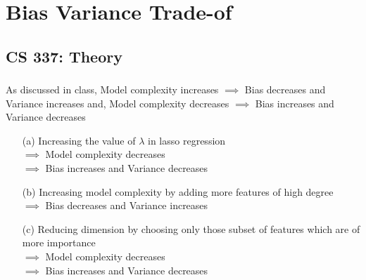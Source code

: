 \documentclass[12pt, fleqn]{article}
\begin{document}
\newpage
\section{Bias Variance Trade-of}
\subsection{CS 337: Theory}
\subsubsection{}
As discussed in class, Model complexity increases $\implies$ Bias decreases and Variance increases and, Model complexity decreases $\implies$ Bias increases and Variance decreases
\begin{enumerate}
  \item[(a)] Increasing the value of $\lambda$ in lasso regression \\
        $\implies$ Model complexity decreases \\
        $\implies$ Bias increases and Variance decreases
  \item[(b)] Increasing model complexity by adding more features of high degree \\
        $\implies$ Bias decreases and Variance increases
  \item[(c)] Reducing dimension by choosing only those subset of features which are of more importance \\
        $\implies$ Model complexity decreases \\
        $\implies$ Bias increases and Variance decreases
\end{enumerate}
\end{document}
